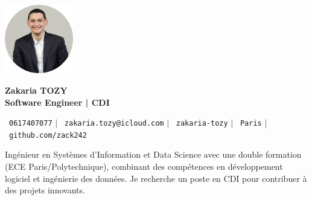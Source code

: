 \documentclass[11pt,a4paper]{article}
\begin{document}
\begin{flushleft}
  \begin{minipage}[c]{0.2\textwidth}
    \includegraphics[width=3cm]{images/profilpicture.png}
  \end{minipage}%
  \begin{minipage}[c]{0.8\textwidth}
    {\Huge \textbf{Zakaria TOZY}} \\[5pt]
    {\Large \textbf{Software Engineer | CDI}}
  \end{minipage}
\end{flushleft}

\vspace{-5pt}

\begin{center}
    \small \faPhone\ \texttt{0617407077} \hspace{1pt} $|$
    \hspace{1pt} \faEnvelope\ \texttt{zakaria.tozy@icloud.com} \hspace{1pt} $|$
    \hspace{1pt} \faLinkedin\ \texttt{zakaria-tozy} \hspace{1pt} $|$
    \hspace{1pt} \faMapMarker\ \texttt{Paris} \hspace{1pt} $|$
    \hspace{1pt} \faGithub\ \texttt{github.com/zack242} \\ \vspace{0pt}
\end{center}

\begin{itemize}[leftmargin=0in, label={}]
\footnotesize{\item{
Ingénieur en Systèmes d'Information et Data Science avec une double formation (ECE Paris/Polytechnique), combinant des compétences en développement logiciel et ingénierie des données. Je recherche un poste en CDI pour contribuer à des projets innovants.
}}
\end{itemize}
\end{document}

